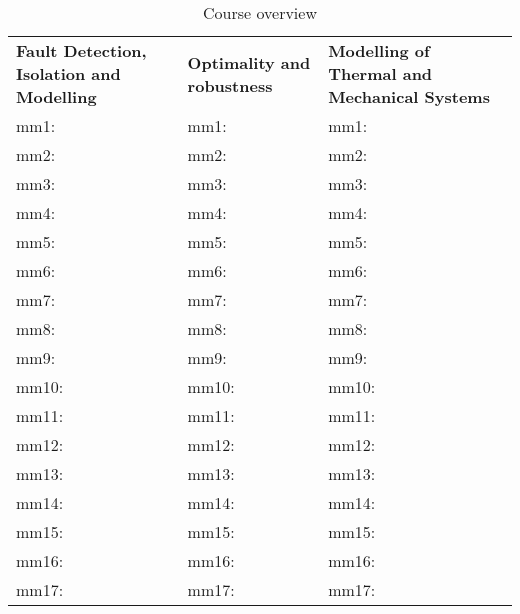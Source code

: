 \begin{table}[H]
\begin{tabularx}{\textwidth}{  X   X   X}
\rowcolor{HeaderBlue} 
\textbf{Fault Detection, Isolation and Modelling} & \textbf{Optimality and robustness} & \textbf{Modelling of Thermal and Mechanical Systems}  \\
mm1: & mm1: &mm1: \\  
\rowcolor{textBlue} 
mm2: &mm2: &mm2: \\
mm3: &mm3: &mm3: \\
\rowcolor{textBlue} 
mm4:&mm4:&mm4: \\
mm5:&mm5:&mm5: \\
\rowcolor{textBlue} 
mm6:&mm6:&mm6: \\
mm7:&mm7:&mm7: \\
\rowcolor{textBlue} 
mm8:&mm8:&mm8: \\
mm9:&mm9:&mm9: \\
\rowcolor{textBlue} 
mm10:&mm10:&mm10: \\
mm11:&mm11:&mm11: \\
\rowcolor{textBlue} 
mm12:&mm12:&mm12: \\
mm13:&mm13:&mm13: \\
\rowcolor{textBlue} 
mm14:&mm14:&mm14: \\
mm15:&mm15:&mm15: \\
\rowcolor{textBlue} 
mm16:&mm16:&mm16: \\
mm17:&mm17:&mm17: \\
\end{tabularx}
	\caption{Course overview}
\label{lol_course}
\end{table}
